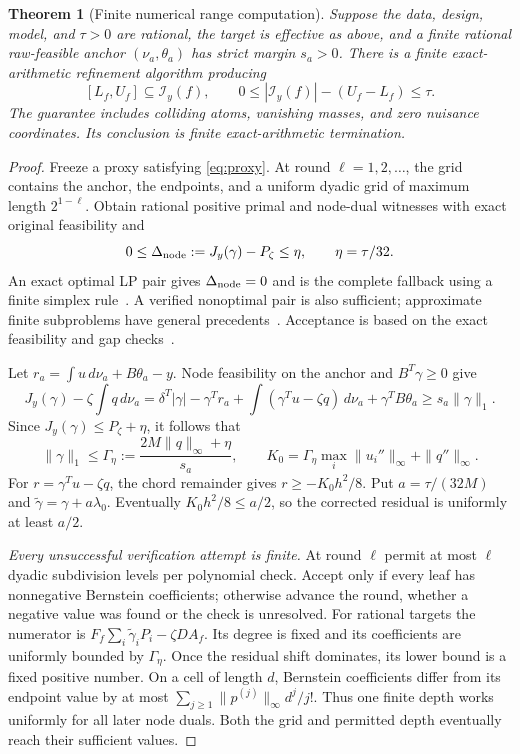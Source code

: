 \documentclass[10pt]{amsart}
\newtheorem{theorem}{Theorem}[section]
\theoremstyle{definition}
\theoremstyle{remark}
\newcommand{\dd}{\,d}
\begin{document}
\begin{theorem}[Finite numerical range computation]\label{thm:numerical}
Suppose the data, design, model, and $\tau>0$ are rational, the target is effective as above, and a finite rational raw-feasible anchor $(\nu_a,\theta_a)$ has strict margin $s_a>0$. There is a finite exact-arithmetic refinement algorithm producing
\begin{equation}\label{eq:range}
 [L_f,U_f]\subseteq\mathcal I_y(f),\qquad
 0\le|\mathcal I_y(f)|-(U_f-L_f)\le\tau.
\end{equation}
The guarantee includes colliding atoms, vanishing masses, and zero nuisance coordinates. Its conclusion is finite exact-arithmetic termination.
\end{theorem}
\begin{proof}
Freeze a proxy satisfying \eqref{eq:proxy}. At round $\ell=1,2,\ldots$, the grid contains the anchor, the endpoints, and a uniform dyadic grid of maximum length $2^{1-\ell}$. Obtain rational positive primal and node-dual witnesses with exact original feasibility and
\begin{equation}\label{eq:nodegap}
 0\le\Delta_{\rm node}:=J_y(\gamma)-P_\zeta\le\eta,
 \qquad \eta=\tau/32.
\end{equation}
An exact optimal LP pair gives $\Delta_{\rm node}=0$ and is the complete fallback using a finite simplex rule~\cite{bland}. A verified nonoptimal pair is also sufficient; approximate finite subproblems have general precedents~\cite{schmid}. Acceptance is based on the exact feasibility and gap checks~\cite{jansson}.

Let $r_a=\int u\dd\nu_a+B\theta_a-y$. Node feasibility on the anchor and $B^T\gamma\ge0$ give
\[
 J_y(\gamma)-\zeta\int q\dd\nu_a
 =\delta^T|\gamma|-\gamma^Tr_a+
 \int(\gamma^Tu-\zeta q)\dd\nu_a+\gamma^TB\theta_a
 \ge s_a\|\gamma\|_1.
\]
Since $J_y(\gamma)\le P_\zeta+\eta$, it follows that
\[
 \|\gamma\|_1\le\Gamma_\eta:=\frac{2M\|q\|_\infty+\eta}{s_a},
 \qquad K_0=\Gamma_\eta\max_i\|u_i''\|_\infty+\|q''\|_\infty.
\]
For $r=\gamma^Tu-\zeta q$, the chord remainder gives $r\ge-K_0h^2/8$. Put $a=\tau/(32M)$ and $\widetilde\gamma=\gamma+a\lambda_0$. Eventually $K_0h^2/8\le a/2$, so the corrected residual is uniformly at least $a/2$.

\emph{Every unsuccessful verification attempt is finite.} At round $\ell$ permit at most $\ell$ dyadic subdivision levels per polynomial check. Accept only if every leaf has nonnegative Bernstein coefficients; otherwise advance the round, whether a negative value was found or the check is unresolved. For rational targets the numerator is $F_f\sum_i\widetilde\gamma_iP_i-\zeta DA_f$. Its degree is fixed and its coefficients are uniformly bounded by $\Gamma_\eta$. Once the residual shift dominates, its lower bound is a fixed positive number. On a cell of length $d$, Bernstein coefficients differ from its endpoint value by at most $\sum_{j\ge1}\|p^{(j)}\|_\infty d^j/j!$. Thus one finite depth works uniformly for all later node duals. Both the grid and permitted depth eventually reach their sufficient values.


\end{proof}
\end{document}
